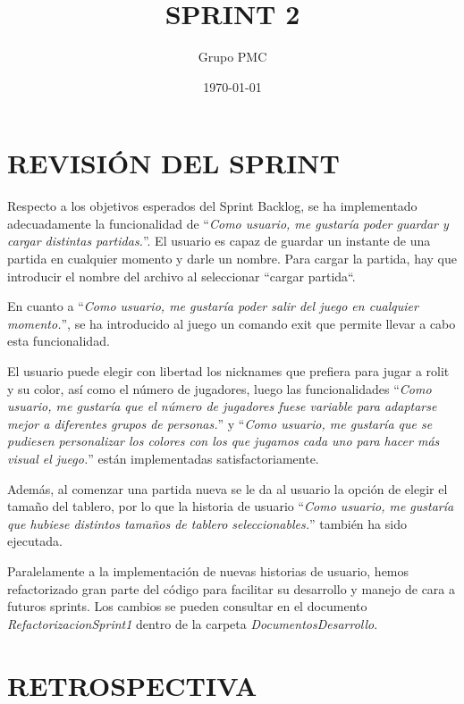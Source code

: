 \documentclass{article}
\title{SPRINT 2}
\date{\today}
\author{Grupo PMC}
\begin{document}
\maketitle
\section{REVISIÓN DEL SPRINT}
Respecto a los objetivos esperados del Sprint Backlog, se ha implementado adecuadamente la funcionalidad de ``\textit{Como usuario, me gustaría poder guardar y cargar distintas partidas.}''. El usuario es capaz de guardar un instante de una partida en cualquier momento y darle un nombre. Para cargar la partida, hay que introducir el nombre del archivo al seleccionar ``cargar partida``.

En cuanto a ``\textit{Como usuario, me gustaría poder salir del juego en cualquier momento.}'', se ha introducido al juego un comando exit que permite llevar a cabo esta funcionalidad.

El usuario puede elegir con libertad los nicknames que prefiera para jugar a rolit y su color, así como el número de jugadores, luego las funcionalidades ``\textit{Como usuario, me gustaría que el número de jugadores fuese variable para adaptarse mejor a diferentes grupos de personas.}'' y ``\textit{Como usuario, me gustaría que se pudiesen personalizar los colores con los que jugamos cada uno para hacer más visual el juego.}''  están implementadas satisfactoriamente.

Además, al comenzar una partida nueva se le da al usuario la opción de elegir el tamaño del tablero, por lo que la historia de usuario ``\textit{Como usuario, me gustaría que hubiese distintos tamaños de tablero seleccionables.}'' también ha sido ejecutada.

Paralelamente a la implementación de nuevas historias de usuario, hemos refactorizado gran parte del código para facilitar su desarrollo y manejo de cara a futuros sprints. Los cambios se pueden consultar en el documento \textit{RefactorizacionSprint1} dentro de la carpeta \textit{DocumentosDesarrollo}.



\section{RETROSPECTIVA}
\end{document}
